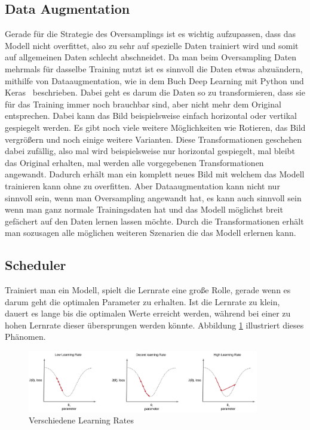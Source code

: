 \documentclass[12pt, a4paper]{article}
\begin{document}
\subsection{Data Augmentation}
Gerade für die Strategie des Oversamplings ist es wichtig aufzupassen, dass das Modell nicht overfittet, also zu sehr auf spezielle Daten trainiert wird und somit auf allgemeinen Daten schlecht abschneidet. Da man beim Oversampling Daten mehrmals für dasselbe Training nutzt ist es sinnvoll die Daten etwas abzuändern, mithilfe von Dataaugmentation, wie in dem Buch \glqq Deep Learning mit Python und Keras\grqq{}~\cite{b6} beschrieben. Dabei geht es darum die Daten so zu transformieren, dass sie für das Training immer noch brauchbar sind, aber nicht mehr dem Original entsprechen. Dabei kann das Bild beispielsweise einfach horizontal oder vertikal gespiegelt werden. Es gibt noch viele weitere Möglichkeiten wie Rotieren, das Bild vergrößern und noch einige weitere Varianten. Diese Transformationen geschehen dabei zufällig, also mal wird beispielsweise nur horizontal gespiegelt, mal bleibt das Original erhalten, mal werden alle vorgegebenen Transformationen angewandt. Dadurch erhält man ein komplett neues Bild mit welchem das Modell trainieren kann ohne zu overfitten. Aber Dataaugmentation kann nicht nur sinnvoll sein, wenn man Oversampling angewandt hat, es kann auch sinnvoll sein wenn man ganz normale Trainingsdaten hat und das Modell möglichst breit gefächert auf den Daten lernen lassen möchte. Durch die Transformationen erhält man sozusagen alle möglichen weiteren Szenarien die das Modell erlernen kann.

\subsection{Scheduler}
Trainiert man ein Modell, spielt die Lernrate eine große Rolle, gerade wenn es darum geht die optimalen Parameter zu erhalten. Ist die Lernrate zu klein, dauert es lange bis die optimalen Werte erreicht werden, während bei einer zu hohen Lernrate dieser übersprungen werden könnte. Abbildung \ref{fig:lr} illustriert dieses Phänomen.

\begin{figure}[t]
\centering
\includegraphics[width=0.9\textwidth]{lernrates-vs.png}
\caption{Verschiedene Learning Rates}
\label{fig:lr}
\end{figure}
\end{document}
